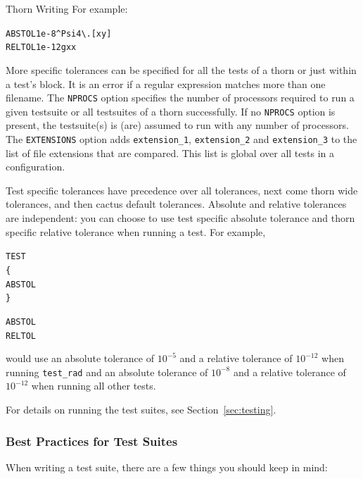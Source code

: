 \begin{cactuspart}{Thorn Writing}
For example:

\begin{alltt}
ABSTOL 1e-8 ^Psi4\textbackslash.[xy]
RELTOL 1e-12 gxx
\end{alltt}

More specific tolerances can be specified for all the tests of a thorn
or just within a test's block. It is an error if a regular expression
matches more than one filename.
The \texttt{NPROCS} option specifies the number of processors required to
run a given testsuite  or all testsuites of a thorn
successfully. If no \texttt{NPROCS} option is present, the testsuite(s)
is (are) assumed to run with any number of processors.
The \texttt{EXTENSIONS} option adds
\verb|extension_1|, \verb|extension_2| and \verb|extension_3| to the
list of file extensions that are compared. This list is global over
all tests in a configuration.

Test specific tolerances have precedence over all tolerances, next
come thorn wide tolerances, and then cactus default tolerances.
Absolute and relative tolerances are independent: you can choose to
use test specific absolute tolerance and thorn specific relative
tolerance when running a test. For example,

\begin{alltt}
TEST 
\{
  ABSTOL 
\}

ABSTOL  
RELTOL  
\end{alltt}

would use an absolute tolerance of $10^{-5}$ and a relative tolerance of
$10^{-12}$ when running \verb|test_rad| and an absolute tolerance of $10^{-8}$
and a relative tolerance of $10^{-12}$ when running all other tests.

For details on running the test suites, see Section~\ref{sec:testing}.

\subsubsection{Best Practices for Test Suites}

When writing a test suite, there are a few things you should keep in
mind:


\end{cactuspart}
